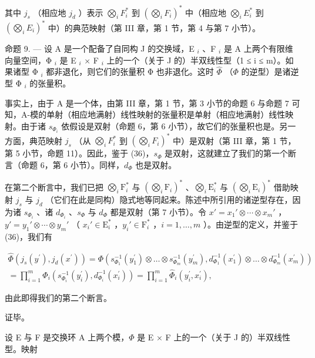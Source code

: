 其中 \(j_s\) （相应地 \(j_d\) ）表示 \(\bigotimes_i F_i^*\) 到 \((\bigotimes_i F_i)^*\) 中（相应地 \(\bigotimes_i E_i^*\) 到 \((\bigotimes_i E_i)^*\) 中）的典范映射（第 III 章，第 1 节，第 4 与第 7 小节）。

命题 9. — 设 A 是一个配备了自同构 J 的交换域，E \(_{i}\) 、F \(_{i}\) 是 A 上两个有限维向量空间，Φ \(_{i}\) 是 E \(_{i}\) × F \(_{i}\) 上的一个（关于 J 的）半双线性型（1 ≤ i ≤ m）。如果诸型 Φ \(_{i}\) 都非退化，则它们的张量积 Φ 也非退化。这时 \(\hat{\Phi}\) （\(\Phi\) 的逆型）是诸逆型 Φ \(_{i}\) 的张量积。

事实上，由于 A 是一个体，由第 III 章，第 1 节，第 3 小节的命题 6 与命题 7 可知，A-模的单射（相应地满射）线性映射的张量积是单射（相应地满射）线性映射。由于诸 \(s_{\Phi_i}\) 依假设是双射（命题 6，第 6 小节），故它们的张量积也是。另一方面，典范映射 \(j_s\) （从 \(\bigotimes_i F_i^*\) 到 \((\bigotimes_i F_i)^*\) 中）是双射（第 III 章，第 1 节，第 5 小节，命题 11）。因此，鉴于 (36)，\(s_\Phi\) 是双射，这就建立了我们的第一个断言（命题 6，第 6 小节）。同样，\(d_\Phi\) 也是双射。

在第二个断言中，我们已把 \(\bigotimes_{i} \mathrm{F}_{i}^{*}\) 与 \((\bigotimes_{i} \mathrm{F}_{i})^{*}\) 、\(\bigotimes_{i} \mathrm{E}_{i}^{*}\) 与 \((\bigotimes_{i} \mathrm{E}_{i})^{*}\) 借助映射 \(j_{s}\) 与 \(j_{d}\) （它们在此是同构）隐式地等同起来。陈述中所引用的诸逆型存在，因为诸 \(s_{\Phi_{i}}\) 、诸 \(d_{\Phi_{i}}\) 、\(s_{\Phi}\) 与 \(d_{\Phi}\) 都是双射（第 7 小节）。令 \(x' = x_{1}' \otimes \cdots \otimes x_{m}'\) ，\(y' = y_{1}' \otimes \cdots \otimes y_{m}'\) （ \(x_{i}' \in \mathrm{E}_{i}^{*}\) ，\(y_{i}' \in \mathrm{F}_{i}^{*}\) ，\(i = 1, \ldots, m\) ）。由逆型的定义，并鉴于 (36)，我们有

\[
\begin{array}{l} \widehat {\Phi} (j _ {s} (y ^ {\prime}), j _ {d} (x ^ {\prime})) = \Phi (s _ {\Phi_ {1}} ^ {- 1} (y _ {1} ^ {\prime}) \otimes \dots \otimes s _ {\Phi_ {m}} ^ {- 1} (y _ {m} ^ {\prime}), d _ {\Phi_ {1}} ^ {- 1} (x _ {1} ^ {\prime}) \otimes \dots \otimes d _ {\Phi_ {m}} ^ {- 1} (x _ {m} ^ {\prime})) \\ = \prod_ {i = 1} ^ {m} \Phi_ {i} (s _ {\Phi_ {i}} ^ {- 1} (y _ {i} ^ {\prime}), d _ {\Phi_ {i}} ^ {- 1} (x _ {i} ^ {\prime})) = \prod_ {i = 1} ^ {m} \widehat {\Phi} _ {i} (y _ {i} ^ {\prime}, x _ {i} ^ {\prime}), \end{array}
\]

由此即得我们的第二个断言。

证毕。

设 E 与 F 是交换环 A 上两个模，\(\Phi\) 是 E × F 上的一个（关于 J 的）半双线性型。映射

